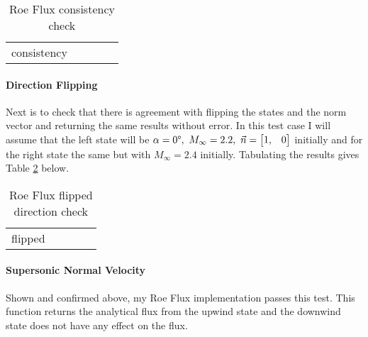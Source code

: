 \begin{table}[h]
    \centering
    \caption[Roe Flux Consistency Check]{Roe Flux consistency check}
    \label{tab:roe_flux_consistency}
    \begin{tabular}{c|c|c|c|c}
        {consistency}
    \end{tabular}
\end{table}

\paragraph{Direction Flipping} Next is to check that there is agreement with flipping the states and the norm vector and returning the same results without error. In this test case I will assume that the left state will be $\alpha = 0\degree,\ M_\infty = 2.2,\ \vec{n} = \begin{bmatrix} 1, & 0 \end{bmatrix}$ initially and for the right state the same but with $M_\infty = 2.4$ initially. Tabulating the results gives Table \ref{tab:roe_flux_flipped} below.

\begin{table}[h]
    \centering
    \caption[Roe Flux Flipped Direction Check]{Roe Flux flipped direction check}
    \label{tab:roe_flux_flipped}
    \begin{tabular}{c|c|c|c|c}
        {flipped}
    \end{tabular}
\end{table}


\paragraph{Supersonic Normal Velocity} Shown and confirmed above, my Roe Flux implementation passes this test. This function returns the analytical flux from the upwind state and the downwind state does not have any effect on the flux.

